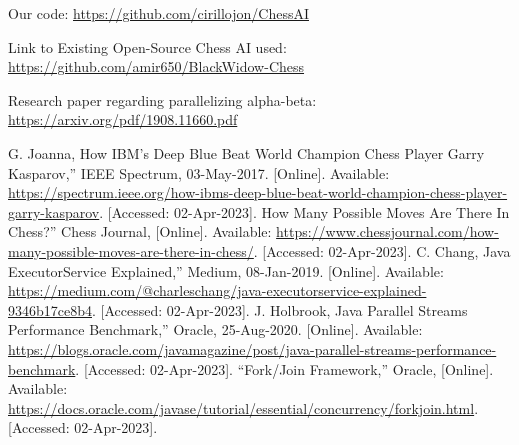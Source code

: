 \documentclass[conference, 11pt]{IEEEtran}
\begin{document}
Our code: \url{https://github.com/cirillojon/ChessAI}

Link to Existing Open-Source Chess AI used: \url{https://github.com/amir650/BlackWidow-Chess}

Research paper regarding parallelizing alpha-beta: \url{https://arxiv.org/pdf/1908.11660.pdf}



\begin{thebibliography}{00}
 G. Joanna, How IBM’s Deep Blue Beat World Champion Chess Player Garry Kasparov,'' IEEE Spectrum, 03-May-2017. [Online]. Available: \url{https://spectrum.ieee.org/how-ibms-deep-blue-beat-world-champion-chess-player-garry-kasparov}. [Accessed: 02-Apr-2023].  How Many Possible Moves Are There In Chess?'' Chess Journal, [Online]. Available: \url{https://www.chessjournal.com/how-many-possible-moves-are-there-in-chess/}. [Accessed: 02-Apr-2023].
 C. Chang, Java ExecutorService Explained,'' Medium, 08-Jan-2019. [Online]. Available: \url{https://medium.com/@charleschang/java-executorservice-explained-9346b17ce8b4}. [Accessed: 02-Apr-2023].  J. Holbrook, Java Parallel Streams Performance Benchmark,'' Oracle, 25-Aug-2020. [Online]. Available: \url{https://blogs.oracle.com/javamagazine/post/java-parallel-streams-performance-benchmark}. [Accessed: 02-Apr-2023].
 ``Fork/Join Framework,'' Oracle, [Online]. Available: \url{https://docs.oracle.com/javase/tutorial/essential/concurrency/forkjoin.html}. [Accessed: 02-Apr-2023].
\end{thebibliography}
\vspace{12pt}
\end{document}
